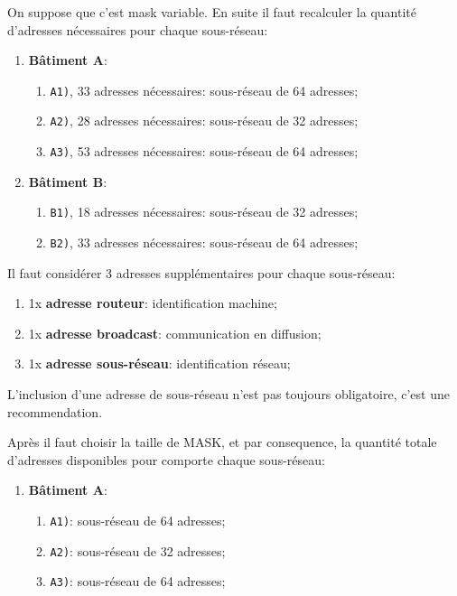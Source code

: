 \documentclass{article}
\begin{document}
\begin{resolution}
    On suppose que c'est mask variable. En suite il faut recalculer la quantité d'adresses nécessaires pour chaque sous-réseau:
    \begin{enumerate}
        \item \textbf{Bâtiment A}:
        \begin{enumerate}[noitemsep]
            \item \texttt{A1)}, 33 adresses nécessaires: sous-réseau de 64 adresses;
            \item \texttt{A2)}, 28 adresses nécessaires: sous-réseau de 32 adresses;
            \item \texttt{A3)}, 53 adresses nécessaires: sous-réseau de 64 adresses;
        \end{enumerate}
        
        \item \textbf{Bâtiment B}:
        \begin{enumerate}[noitemsep]
            \item \texttt{B1)}, 18 adresses nécessaires: sous-réseau de 32 adresses;
            \item \texttt{B2)}, 33 adresses nécessaires: sous-réseau de 64 adresses;
        \end{enumerate}
    \end{enumerate}
    Il faut considérer 3 adresses supplémentaires pour chaque sous-réseau:
    \begin{enumerate}[noitemsep]
        \item 1x \textbf{adresse routeur}: identification machine;
        \item 1x \textbf{adresse broadcast}: communication en diffusion;
        \item 1x \textbf{adresse sous-réseau}: identification réseau;
    \end{enumerate}
    \begin{remark}
        L'inclusion d'une adresse de sous-réseau n'est pas toujours obligatoire, c'est une recommendation.
    \end{remark}
    Après il faut choisir la taille de MASK, et par consequence, la quantité totale d'adresses disponibles pour comporte chaque sous-réseau:
    \begin{enumerate}
        \item \textbf{Bâtiment A}:
        \begin{enumerate}[noitemsep]
            \item \texttt{A1)}: sous-réseau de 64 adresses;
            \item \texttt{A2)}: sous-réseau de 32 adresses;
            \item \texttt{A3)}: sous-réseau de 64 adresses;
        \end{enumerate}
        

\end{enumerate}
\end{resolution}
\end{document}
